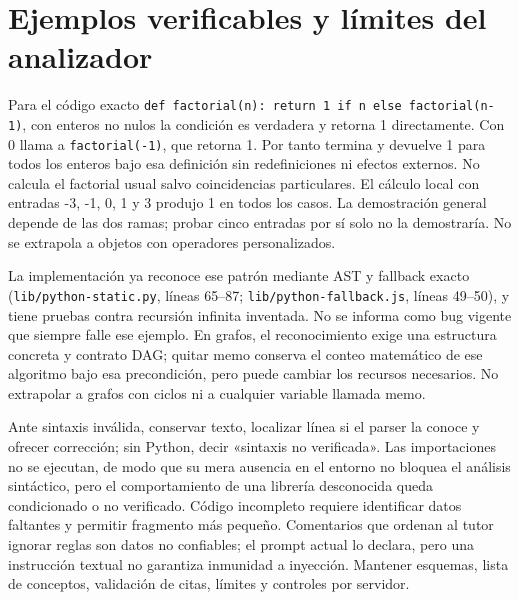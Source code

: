 \documentclass[11pt,a4paper]{report}
\newcommand{\src}[2]{\nolinkurl{#1}, líneas #2}
\begin{document}
\section{Ejemplos verificables y límites del analizador}
Para el código exacto \texttt{def factorial(n): return 1 if n else factorial(n-1)}, con enteros no nulos la condición es verdadera y retorna 1 directamente. Con 0 llama a \texttt{factorial(-1)}, que retorna 1. Por tanto termina y devuelve 1 para todos los enteros bajo esa definición sin redefiniciones ni efectos externos. No calcula el factorial usual salvo coincidencias particulares. El cálculo local con entradas -3, -1, 0, 1 y 3 produjo 1 en todos los casos. La demostración general depende de las dos ramas; probar cinco entradas por sí solo no la demostraría. No se extrapola a objetos con operadores personalizados.

La implementación ya reconoce ese patrón mediante AST y fallback exacto (\src{lib/python-static.py}{65--87}; \src{lib/python-fallback.js}{49--50}), y tiene pruebas contra recursión infinita inventada. No se informa como bug vigente que siempre falle ese ejemplo. En grafos, el reconocimiento exige una estructura concreta y contrato DAG; quitar memo conserva el conteo matemático de ese algoritmo bajo esa precondición, pero puede cambiar los recursos necesarios. No extrapolar a grafos con ciclos ni a cualquier variable llamada memo.

Ante sintaxis inválida, conservar texto, localizar línea si el parser la conoce y ofrecer corrección; sin Python, decir «sintaxis no verificada». Las importaciones no se ejecutan, de modo que su mera ausencia en el entorno no bloquea el análisis sintáctico, pero el comportamiento de una librería desconocida queda condicionado o no verificado. Código incompleto requiere identificar datos faltantes y permitir fragmento más pequeño. Comentarios que ordenan al tutor ignorar reglas son datos no confiables; el prompt actual lo declara, pero una instrucción textual no garantiza inmunidad a inyección. Mantener esquemas, lista de conceptos, validación de citas, límites y controles por servidor.
\end{document}
